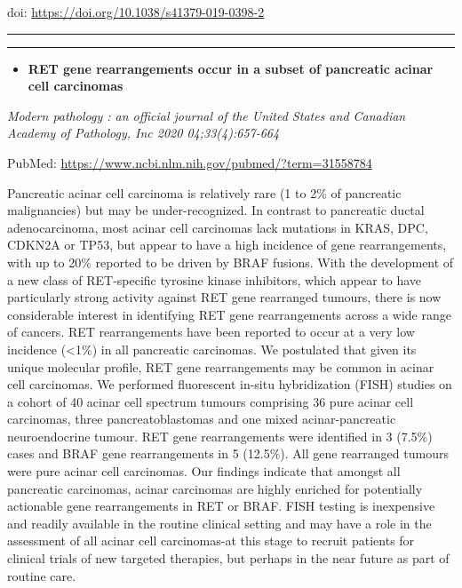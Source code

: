 \documentclass[
]{article}
\providecommand{\tightlist}{%
  \setlength{\itemsep}{0pt}\setlength{\parskip}{0pt}}
\begin{document}
doi: \url{https://doi.org/10.1038/s41379-019-0398-2}

\begin{center}\rule{0.5\linewidth}{0.5pt}\end{center}

\begin{center}\rule{0.5\linewidth}{0.5pt}\end{center}

\begin{itemize}
\tightlist
\item
  \textbf{RET gene rearrangements occur in a subset of pancreatic acinar
  cell carcinomas}
\end{itemize}

\emph{Modern pathology : an official journal of the United States and
Canadian Academy of Pathology, Inc 2020 04;33(4):657-664}

PubMed: \url{https://www.ncbi.nlm.nih.gov/pubmed/?term=31558784}

Pancreatic acinar cell carcinoma is relatively rare (1 to 2\% of
pancreatic malignancies) but may be under-recognized. In contrast to
pancreatic ductal adenocarcinoma, most acinar cell carcinomas lack
mutations in KRAS, DPC, CDKN2A or TP53, but appear to have a high
incidence of gene rearrangements, with up to 20\% reported to be driven
by BRAF fusions. With the development of a new class of RET-specific
tyrosine kinase inhibitors, which appear to have particularly strong
activity against RET gene rearranged tumours, there is now considerable
interest in identifying RET gene rearrangements across a wide range of
cancers. RET rearrangements have been reported to occur at a very low
incidence (\textless1\%) in all pancreatic carcinomas. We postulated
that given its unique molecular profile, RET gene rearrangements may be
common in acinar cell carcinomas. We performed fluorescent in-situ
hybridization (FISH) studies on a cohort of 40 acinar cell spectrum
tumours comprising 36 pure acinar cell carcinomas, three
pancreatoblastomas and one mixed acinar-pancreatic neuroendocrine
tumour. RET gene rearrangements were identified in 3 (7.5\%) cases and
BRAF gene rearrangements in 5 (12.5\%). All gene rearranged tumours were
pure acinar cell carcinomas. Our findings indicate that amongst all
pancreatic carcinomas, acinar carcinomas are highly enriched for
potentially actionable gene rearrangements in RET or BRAF. FISH testing
is inexpensive and readily available in the routine clinical setting and
may have a role in the assessment of all acinar cell carcinomas-at this
stage to recruit patients for clinical trials of new targeted therapies,
but perhaps in the near future as part of routine care.
\end{document}
